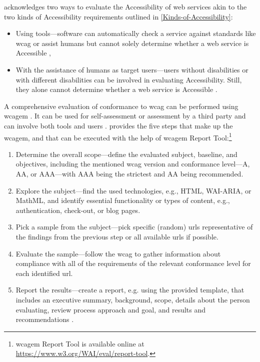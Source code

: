 \textcite{WAI_Evaluation} acknowledges two ways to evaluate the Accessibility of web services akin to the two kinds of Accessibility requirements outlined in \ref{Kinds-of-Accessibility}:

\begin{itemize}
    \item Using tools---software can automatically check a service against standards like \gls{wcag} or assist humans but cannot solely determine whether a web service is Accessible \parencite{WAI_Evaluation_Tools},
    \item With the assistance of humans as target users---users without disabilities or with different disabilities can be involved in evaluating Accessibility. Still, they alone cannot determine whether a web service is Accessible \parencite{WAI_Evaluation_Users}.
\end{itemize}

A comprehensive evaluation of conformance to \gls{wcag} can be performed using \gls{wcagem} \parencite{WAI_Evaluation_Methodology}.
It can be used for self-assessment or assessment by a third party and can involve both tools and users \parencite{WAI_Evaluation_Methodology}.
\textcite{WAI_Evaluation_Methodology} provides the five steps that make up the \gls{wcagem}, and that can be executed with the help of \gls{wcagem} Report Tool:\footnote{\gls{wcagem} Report Tool is available online at \url{https://www.w3.org/WAI/eval/report-tool}.}

\begin{enumerate}
    \item Determine the overall scope---define the evaluated subject, baseline, and objectives, including the mentioned \gls{wcag} version and conformance level---A, AA, or AAA---with AAA being the strictest and AA being recommended.
    \item Explore the subject---find the used technologies, e.g., HTML, WAI-ARIA, or MathML, and identify essential functionality or types of content, e.g., authentication, check-out, or blog pages.
    \item Pick a sample from the subject---pick specific (random) \glspl{url} representative of the findings from the previous step or all available \glspl{url} if possible.
    \item Evaluate the sample---follow the \gls{wcag} to gather information about compliance with all of the requirements of the relevant conformance level for each identified \gls{url}.
    \item Report the results---create a report, e.g. using the provided template, that includes an executive summary, background, scope, details about the person evaluating, review process approach and goal, and results and recommendations \parencite{WAI_Evalutation_Report}.
\end{enumerate}

